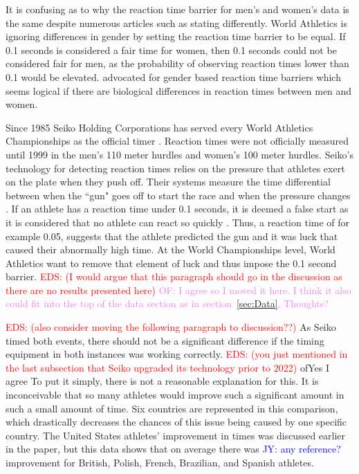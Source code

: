 \documentclass[12pt, letterpaper, titlepage]{article}
\newcommand{\jy}[1]{\textcolor{blue}{JY: #1}}
\newcommand{\eds}[1]{\textcolor{red}{EDS: (#1)}}
\newcommand{\of}[1]{\textcolor{violet}{OF: #1}}
\begin{document}
It is confusing as to why the reaction time barrier for men's and women's data
is the same despite numerous articles such as \citep[e.g.,][]{lipps2011implications, 
babicc2009reaction, panoutsakopoulos2020gender} stating differently.  World
Athletics is ignoring differences in gender by setting the reaction time barrier
to be equal. If 0.1 seconds is considered a fair time for women, then 0.1 seconds
could not be considered fair for men, as the probability of observing reaction
times lower than 0.1 would be elevated.  \citet{brosnan2017effects} advocated
for gender based reaction time barriers which seems logical if there are biological
differences in reaction times between men and women.


Since 1985 Seiko Holding Corporations has served every World Athletics 
Championships as the official timer \citep{wa2022seiko}.  Reaction times were
not officially measured until 1999 in the men's 110 meter hurdles and women's
100 meter hurdles. Seiko's technology for detecting 
reaction times relies on the pressure that athletes exert on the plate when they 
push off.  Their systems measure the time differential between when the ``gun" 
goes off to start the race and when the pressure changes \citep{wa2022seiko}.  
If an athlete has a reaction time under 0.1 seconds, it is deemed a false start 
as it is considered that no athlete can react so quickly \citep{Seiko-Timing}.  
Thus, a reaction time of for example 0.05, suggests that the athlete predicted 
the gun and it was luck that caused their abnormally high time.  At the World 
Championships level, World Athletics want to remove that element of 
luck and thus impose the 0.1 second barrier.
\eds{I would argue that this paragraph should go in the discussion as there are 
no results presented here}
\of{I agree so I moved it here. I think it also could fit into the top of the
data section as in section~\ref{sec:Data}. Thoughts?} 

\eds{also consider moving the following paragraph to discussion??}
As Seiko timed both events, there should not be a significant
difference if the timing equipment in both instances was working correctly.
\eds{you just mentioned in the last subsection that Seiko upgraded its 
technology prior to 2022}
of{Yes I agree}
To put it simply, there is not a reasonable explanation for 
this. It is inconceivable that so many athletes would improve such a significant
amount in such a small amount of time. Six countries are represented in this 
comparison, which drastically decreases the chances of this issue being caused by
one specific country.  The United States athletes' improvement in times was
discussed earlier in the paper, but this data shows that on average there was
\jy{any reference?}
improvement for British, Polish, French, Brazilian, and Spanish athletes.
\end{document}
